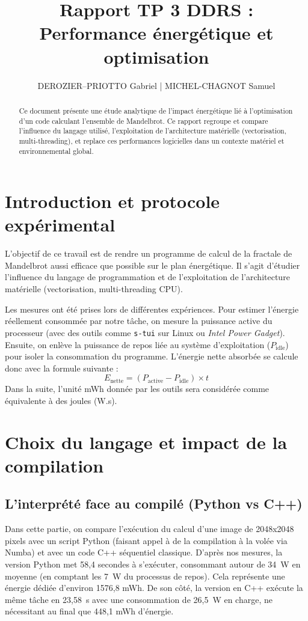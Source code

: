 \documentclass[11pt,a4paper]{article}
\title{Rapport TP 3 DDRS : Performance énergétique et optimisation}
\author{DEROZIER--PRIOTTO Gabriel | MICHEL-CHAGNOT Samuel}
\date{}
\begin{document}
\maketitle

\begin{abstract}
	Ce document présente une étude analytique de l'impact énergétique lié à l'optimisation d'un code calculant l'ensemble de Mandelbrot. Ce rapport regroupe et compare l'influence du langage utilisé, l'exploitation de l'architecture matérielle (vectorisation, multi-threading), et replace ces performances logicielles dans un contexte matériel et environnemental global.
\end{abstract}

\section{Introduction et protocole expérimental}

L'objectif de ce travail est de rendre un programme de calcul de la fractale de Mandelbrot aussi efficace que possible sur le plan énergétique. Il s'agit d'étudier l'influence du langage de programmation et de l'exploitation de l'architecture matérielle (vectorisation, multi-threading CPU).

Les mesures ont été prises lors de différentes expériences. Pour estimer l'énergie réellement consommée par notre tâche, on mesure la puissance active du processeur (avec des outils comme \texttt{s-tui} sur Linux ou \textit{Intel Power Gadget}). Ensuite, on enlève la puissance de repos liée au système d'exploitation ($P_{\text{idle}}$) pour isoler la consommation du programme. L'énergie nette absorbée se calcule donc avec la formule suivante :
\[ E_{\text{nette}} = (P_{\text{active}} - P_{\text{idle}}) \times t \]
Dans la suite, l'unité mWh donnée par les outils sera considérée comme équivalente à des joules (W.s).

\section{Choix du langage et impact de la compilation}

\subsection{L'interprété face au compilé (Python vs C++)}

Dans cette partie, on compare l'exécution du calcul d'une image de 2048x2048 pixels avec un script Python (faisant appel à de la compilation à la volée via Numba) et avec un code C++ séquentiel classique. 
D'après nos mesures, la version Python met 58,4 secondes à s'exécuter, consommant autour de 34~W en moyenne (en comptant les 7~W du processus de repos). Cela représente une énergie dédiée d'environ 1576,8 mWh. De son côté, la version en C++ exécute la même tâche en 23,58~s avec une consommation de 26,5~W en charge, ne nécessitant au final que 448,1 mWh d'énergie.
\end{document}
